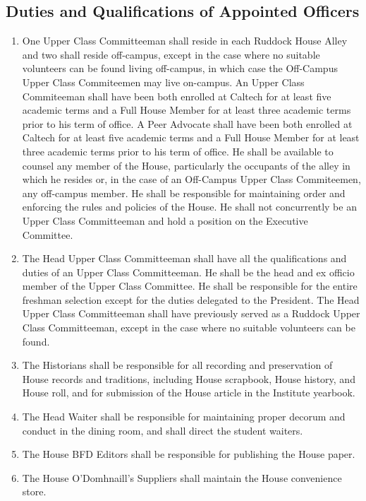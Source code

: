 \documentclass[10pt]{article} %
\begin{document}
\subsection{Duties and Qualifications of Appointed Officers}
\begin{enumerate}
\item One Upper Class Committeeman shall reside in each Ruddock House Alley and two shall reside off-campus, except in the case where no suitable volunteers can be found living off-campus, in which case the Off-Campus Upper Class Commiteemen may live on-campus. An Upper Class Commiteeman shall have been both enrolled at Caltech for at least five academic terms and a Full House Member for at least three academic terms prior to his term of office. A Peer Advocate shall have been both enrolled at Caltech for at least five academic terms and a Full House Member for at least three academic terms prior to his term of office. He shall be available to counsel any member of the House, particularly the occupants of the alley in which he resides or, in the case of an Off-Campus Upper Class Commiteemen, any off-campus member. He shall be responsible for maintaining order and enforcing the rules and policies of the House. He shall not concurrently be an Upper Class Committeeman and hold a position on the Executive Committee.
\item The Head Upper Class Committeeman shall have all the qualifications and duties of an Upper Class Committeeman. He shall be the head and ex officio member of the Upper Class Committee. He shall be responsible for the entire freshman selection except for the duties delegated to the President. The Head Upper Class Committeeman shall have previously served as a Ruddock Upper Class Committeeman, except in the case where no suitable volunteers can be found.
\item The Historians shall be responsible for all recording and preservation of House records and traditions, including House scrapbook, House history, and House roll, and for submission of the House article in the Institute yearbook.
\item The Head Waiter shall be responsible for maintaining proper decorum and conduct in the dining room, and shall direct the student waiters.
\item The House BFD Editors shall be responsible for publishing the House paper.
\item The House O’Domhnaill’s Suppliers shall maintain the House convenience store.
\end{enumerate}
\end{document}
